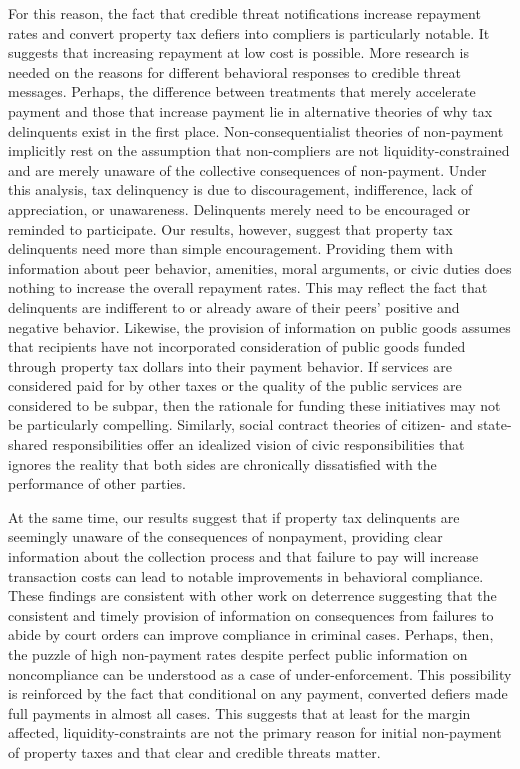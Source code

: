 \documentclass[12pt,titlepage]{article}
\begin{document}
For this reason, the fact that credible threat notifications increase 
repayment rates and convert property tax defiers into compliers is particularly notable. 
It suggests that increasing repayment at low cost is possible. More research is 
needed on the reasons for different behavioral responses to credible threat messages. Perhaps, the difference 
between treatments that merely accelerate payment and those that increase 
payment lie in alternative theories of why tax delinquents exist in the 
first place. Non-consequentialist theories of non-payment implicitly rest 
on the assumption that non-compliers are not liquidity-constrained and are
merely unaware of the collective consequences of non-payment. Under this 
analysis, tax delinquency is due to discouragement, indifference, 
lack of appreciation, or unawareness. Delinquents merely need to be 
encouraged or reminded to participate. Our results, however, suggest 
that property tax delinquents need more than simple encouragement. Providing them with 
information about peer behavior, amenities, moral arguments, or civic 
duties does nothing to increase the overall repayment rates. This may 
reflect the fact that delinquents are indifferent to or already aware 
of their peers' positive and negative behavior. Likewise, the provision 
of information on public goods assumes that recipients have not 
incorporated consideration of public goods funded through property tax dollars 
into their payment behavior. If services are considered paid for by 
other taxes or the quality of the public services are considered to be 
subpar, then the rationale for funding these initiatives may not be 
particularly compelling.  Similarly, social contract theories of citizen- 
and state-shared responsibilities offer an idealized vision of civic 
responsibilities that ignores the reality that both sides are chronically 
dissatisfied with the performance of other parties.

At the same time, our results suggest that if property tax delinquents are 
seemingly unaware of the consequences of nonpayment, providing clear information 
about the collection process and that failure to pay will increase transaction costs 
can lead to notable improvements in behavioral compliance. These findings are consistent
with other work on deterrence suggesting that the consistent and timely provision of information on consequences 
from failures to abide by court orders can improve compliance in criminal cases\citep{hawken}. 
Perhaps, then, the puzzle of high non-payment 
rates despite perfect public information on noncompliance can be understood 
as a case of under-enforcement. This possibility is reinforced by the fact 
that conditional on any payment, converted defiers made full payments in almost all cases. 
This suggests that at least for the margin affected, liquidity-constraints are not the primary 
reason for initial non-payment of property taxes and that clear and credible threats matter.
\end{document}
